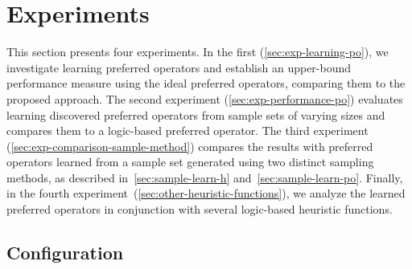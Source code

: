 \documentclass[ppgc,diss,english]{iiufrgs}
\begin{document}

%
%
\chapter{Experiments}
\label{cha:exp-experiments}
This section presents four experiments. In the first (\cref{sec:exp-learning-po}), we investigate learning preferred operators and establish an upper-bound performance measure using the ideal preferred operators, comparing them to the proposed approach. The second experiment (\cref{sec:exp-performance-po}) evaluates learning discovered preferred operators from sample sets of varying sizes and compares them to a logic-based preferred operator. The third experiment (\cref{sec:exp-comparison-sample-method}) compares the results with preferred operators learned from a sample set generated using two distinct sampling methods, as described in~\cref{sec:sample-learn-h} and~\cref{sec:sample-learn-po}. Finally, in the fourth experiment~(\cref{sec:other-heuristic-functions}), we analyze the learned preferred operators in conjunction with several logic-based heuristic functions.


\section{Configuration}
\label{sec:exp-configuration}
\end{document}
